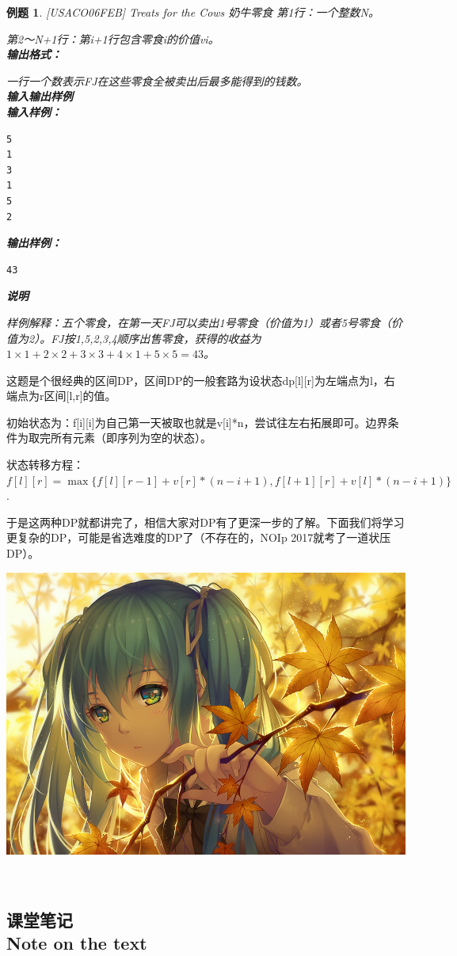 \documentclass{article}
\newtheorem{example}{例题}[subsection]
\theoremstyle{nonumberplain}
\newcommand{\note}{\ \par
	\subsection*{课堂笔记\\\tiny{Note on the text}}
	\newpage}
\begin{document}
\begin{example}{[USACO06FEB] Treats for the Cows 奶牛零食}
	第1行：一个整数N。

	第2～N+1行：第i+1行包含零食i的价值vi。\\
	\textbf{输出格式：}

	一行一个数表示FJ在这些零食全被卖出后最多能得到的钱数。\\
	\textbf{输入输出样例}\\
	\textbf{输入样例：}

	\begin{verbatim}
5
1
3
1
5
2
\end{verbatim}
	\textbf{输出样例：}
	\begin{verbatim} 
43
\end{verbatim}
	\textbf{说明}

	样例解释：五个零食，在第一天FJ可以卖出1号零食（价值为1）或者5号零食（价值为2）。FJ按1,5,2,3,4顺序出售零食，获得的收益为$1\times 1+2\times 2+3\times 3+4\times 1+5\times 5=43$。
\end{example}

这题是个很经典的区间DP，区间DP的一般套路为设状态dp[l][r]为左端点为l，右端点为r区间[l,r]的值。

初始状态为：f[i][i]为自己第一天被取也就是v[i]*n，尝试往左右拓展即可。边界条件为取完所有元素（即序列为空的状态）。

状态转移方程：$f[l][r]=\max\{f[l][r-1]+v[r]*(n-i+1),f[l+1][r]+v[l]*(n-i+1)\}$.
\ \\ \par
于是这两种DP就都讲完了，相信大家对DP有了更深一步的了解。下面我们将学习更复杂的DP，可能是省选难度的DP了（不存在的，NOIp 2017就考了一道状压DP）。
\begin{center}\includegraphics[scale=0.8]{47046948_p0.png}\end{center}
\note
\end{document}

